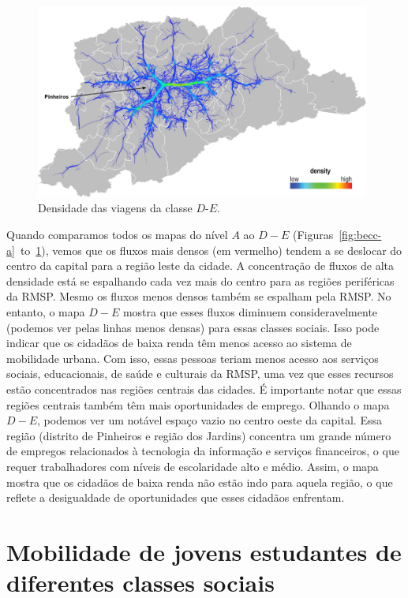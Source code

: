 \begin{figure}[!htb]
  \centering
  \captionsetup{justification=centering}
  \includegraphics[width=0.98\textwidth]{../figuras/6-class-d-e.png}
  \caption{Densidade das viagens da classe $D$-$E$. \label{fig:becc-d-e}}
\end{figure}

Quando comparamos todos os mapas do nível $A$ ao $D-E$
(Figuras~\ref{fig:becc-a}~to~\ref{fig:becc-d-e}), vemos que os fluxos mais
densos (em vermelho) tendem a se deslocar do centro da capital para a região
leste da cidade. A concentração de fluxos de alta densidade está se espalhando
cada vez mais do centro para as regiões periféricas da RMSP. Mesmo os fluxos
menos densos também se espalham pela RMSP. No entanto, o mapa $D-E$ mostra que
esses fluxos diminuem consideravelmente (podemos ver pelas linhas menos densas)
para essas classes sociais. Isso pode indicar que os cidadãos de baixa renda
têm menos acesso ao sistema de mobilidade urbana. Com isso, essas pessoas teriam
menos acesso aos serviços sociais, educacionais, de saúde e culturais da RMSP,
uma vez que esses recursos estão concentrados nas regiões centrais das cidades.
É importante notar que essas regiões centrais também têm mais oportunidades de
emprego. Olhando o mapa $D-E$, podemos ver um notável espaço vazio no centro
oeste da capital. Essa região (distrito de Pinheiros e região dos Jardins) concentra um grande número
de empregos relacionados à tecnologia da informação e serviços financeiros, o
que requer trabalhadores com níveis de escolaridade alto e médio. Assim, o mapa
mostra que os cidadãos de baixa renda não estão indo para aquela região, o que
reflete a desigualdade de oportunidades que esses cidadãos enfrentam.

\section{Mobilidade de jovens estudantes de diferentes classes sociais}
\label{sec:students}

